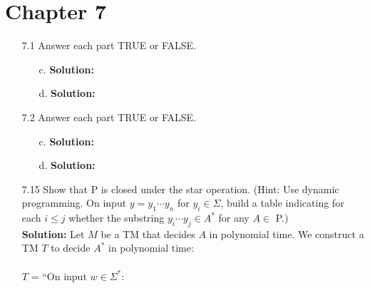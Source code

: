\section{Chapter 7}
\begin{enumerate}
\item[7.1]Answer each part TRUE or FALSE.
\begin{enumerate}
\item[c.]\textbf{Solution:} \alreadyanswered
\item[d.]\textbf{Solution:} \alreadyanswered
\end{enumerate}

\item[7.2]Answer each part TRUE or FALSE.
\begin{enumerate}
\item[c.]\textbf{Solution:} \alreadyanswered
\item[d.]\textbf{Solution:} \alreadyanswered
\end{enumerate}

\item[7.15]Show that P is closed under the star operation. (Hint: Use dynamic programming. On input $y = y_1\cdots y_n$ for $y_i \in \Sigma$, build a table indicating for each $i \le j$ whether the substring $y_i\cdots y_j \in A^*$ for any $A \in$ P.)
\\
\textbf{Solution:} Let $M$ be a TM that decides $A$ in polynomial time. We construct a TM $T$ to decide $A^*$ in polynomial time:
\\ \\
$T$ = ``On input $w \in \Sigma^*$:



\end{enumerate}
